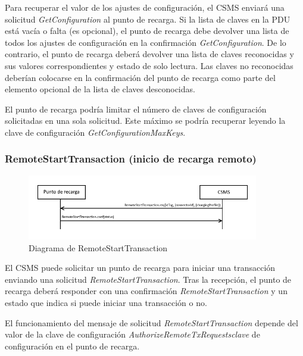 \documentclass[12pt,a4paper,onecolumn,oneside]{report}
\begin{document}
Para recuperar el valor de los ajustes de configuración, el CSMS enviará una solicitud \textit{GetConfiguration} al punto de recarga. Si la lista de claves en la PDU está vacía o falta (es opcional), el punto de recarga debe devolver una lista de todos los ajustes de configuración en la confirmación \textit{GetConfiguration}. De lo contrario, el punto de recarga deberá devolver una lista de claves reconocidas y sus valores correspondientes y estado de solo lectura. Las claves no reconocidas deberían colocarse en la confirmación del punto de recarga como parte del elemento opcional de la lista de claves desconocidas.

El punto de recarga podría limitar el número de claves de configuración solicitadas en una sola solicitud. Este máximo se podría recuperar leyendo la clave de configuración \textit{GetConfigurationMaxKeys}.


\subsubsection{RemoteStartTransaction (inicio de recarga remoto)}
\label{RemoteStartTransaction (inicio de recarga remoto)}


\begin{figure}[H] 
\centering
  \includegraphics[width=0.9\textwidth]{figuras/diagramaremotestarttransaction.png}
  \caption[Diagrama de \textit{RemoteStartTransaction}]{Diagrama de RemoteStartTransaction\\
  }
  \label{fig:diagramaremotestarttransaction}
\end{figure}



El CSMS puede solicitar un punto de recarga para iniciar una transacción enviando una solicitud \textit{RemoteStartTransaction}. Tras la recepción, el punto de recarga deberá responder con una confirmación \textit{RemoteStartTransaction} y un estado que indica si puede iniciar una transacción o no.

El funcionamiento del mensaje de solicitud \textit{RemoteStartTransaction} depende del valor de la clave de configuración \textit{AuthorizeRemoteTxRequestsclave} de configuración en el punto de recarga.
\end{document}
